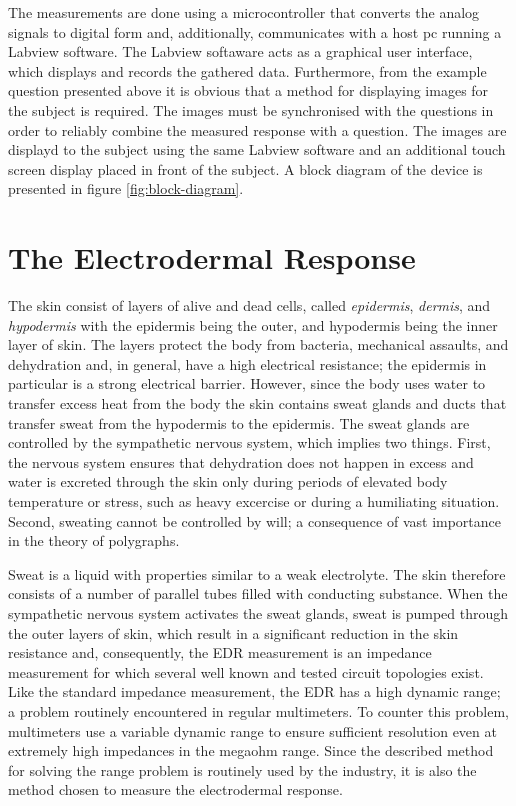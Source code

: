 \documentclass[a4paper,11pt]{article}
\begin{document}
The measurements are done using a microcontroller that converts the
analog signals to digital form and, additionally, communicates with a
host pc running a Labview software. The Labview softaware acts as a
graphical user interface, which displays and records the gathered
data. Furthermore, from the example question presented above it is
obvious that a method for displaying images for the subject is
required. The images must be synchronised with the questions in order
to reliably combine the measured response with a question. The images
are displayd to the subject using the same Labview software and an
additional touch screen display placed in front of the subject. A
block diagram of the device is presented in figure
\ref{fig:block-diagram}.

\section{The Electrodermal Response}
The skin consist of layers of alive and dead cells, called
\emph{epidermis}, \emph{dermis}, and \emph{hypodermis} with the
epidermis being the outer, and hypodermis being the inner layer of
skin. The layers protect the body from bacteria, mechanical assaults,
and dehydration and, in general, have a high electrical resistance;
the epidermis in particular is a strong electrical barrier. However,
since the body uses water to transfer excess heat from the body the
skin contains sweat glands and ducts that transfer sweat from the
hypodermis to the epidermis. The sweat glands are controlled by the
sympathetic nervous system, which implies two things. First, the
nervous system ensures that dehydration does not happen in excess and
water is excreted through the skin only during periods of elevated
body temperature or stress, such as heavy excercise or during a
humiliating situation. Second, sweating cannot be controlled by will;
a consequence of vast importance in the theory of
polygraphs.\cite{Malmivuo1995}

Sweat is a liquid with properties similar to a weak electrolyte. The
skin therefore consists of a number of parallel tubes filled with
conducting substance. When the sympathetic nervous system activates
the sweat glands, sweat is pumped through the outer layers of skin,
which result in a significant reduction in the skin resistance and,
consequently, the EDR measurement is an impedance measurement for
which several well known and tested circuit topologies exist. Like the
standard impedance measurement, the EDR has a high dynamic range; a
problem routinely encountered in regular multimeters. To counter this
problem, multimeters use a variable dynamic range to ensure sufficient
resolution even at extremely high impedances in the megaohm
range. Since the described method for solving the range problem is
routinely used by the industry, it is also the method chosen to
measure the electrodermal response.
\end{document}
